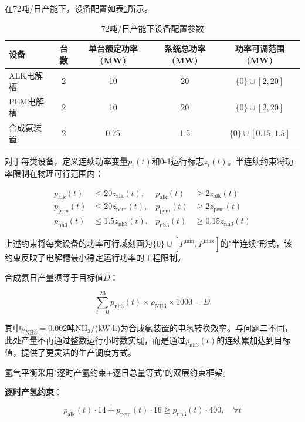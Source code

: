 \documentclass[zihao=-4,a4paper]{ctexart} %
\begin{document}
	在72吨/日产能下，设备配置如表\ref{tab:q3_devices}所示。
	
	\begin{table}[ht]
		\centering
		\caption{72吨/日产能下设备配置参数}
		\label{tab:q3_devices}
		\begin{tabular}{lcccc}
			\toprule
			设备 & 台数 & 单台额定功率(MW) & 系统总功率(MW) & 功率可调范围(MW)\\
			\midrule
			ALK电解槽 & 2 & 10 & 20 & $\{0\}\cup[2,20]$ \\
			PEM电解槽 & 2 & 10 & 20 & $\{0\}\cup[2,20]$ \\
			合成氨装置 & 2 & 0.75 & 1.5 & $\{0\}\cup[0.15,1.5]$ \\
			\bottomrule
		\end{tabular}
	\end{table}
	
	对于每类设备，定义连续功率变量$p_i(t)$和0-1运行标志$z_i(t)$。半连续约束将功率限制在物理可行范围内：
	
	\begin{align}
		p_{\text{alk}}(t) &\leq 20 z_{\text{alk}}(t), &
		p_{\text{alk}}(t) &\geq 2 z_{\text{alk}}(t) \label{eq:semi_alk}\\
		p_{\text{pem}}(t) &\leq 20 z_{\text{pem}}(t), &
		p_{\text{pem}}(t) &\geq 2 z_{\text{pem}}(t) \label{eq:semi_pem}\\
		p_{\text{nh3}}(t) &\leq 1.5 z_{\text{nh3}}(t), &
		p_{\text{nh3}}(t) &\geq 0.15 z_{\text{nh3}}(t) \label{eq:semi_nh3}
	\end{align}
	
	上述约束将每类设备的功率可行域刻画为$\{0\} \cup [P^{\min}, P^{\max}]$的"半连续"形式，该约束反映了电解槽最小稳定运行功率的工程限制。
	
	合成氨日产量须等于目标值$D$：
	
	\begin{equation}
		\sum_{t=0}^{23} p_{\text{nh3}}(t) \times \rho_{\text{NH3}} \times 1000 = D
		\label{eq:prod_target}
	\end{equation}
	
	其中$\rho_{\text{NH3}} = 0.002$吨NH$_3$/(kW$\cdot$h)为合成氨装置的电氢转换效率。与问题二不同，此处产量不再通过整数运行小时数实现，而是通过$p_{\text{nh3}}(t)$的连续累加达到目标值，提供了更灵活的生产调度方式。
	
	氢气平衡采用"逐时产氢约束+逐日总量等式"的双层约束框架。
	
	\textbf{逐时产氢约束}：
	
	\begin{equation}
		p_{\text{alk}}(t) \cdot 14 + p_{\text{pem}}(t) \cdot 16 \geq p_{\text{nh3}}(t) \cdot 400, \quad \forall t
		\label{eq:h2_hourly}
	\end{equation}
	
\end{document}
